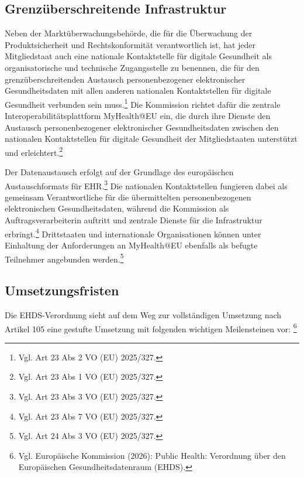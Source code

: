     \subsection{Grenzüberschreitende Infrastruktur}
Neben der Marktüberwachungsbehörde, die für die Überwachung der Produktsicherheit und Rechtskonformität verantwortlich ist, hat jeder Mitgliedstaat auch eine nationale Kontaktstelle für digitale Gesundheit als organisatorische und technische Zugangsstelle zu benennen, die für den grenzüberschreitenden Austausch personenbezogener elektronischer Gesundheitsdaten mit allen anderen nationalen Kontaktstellen für digitale Gesundheit verbunden sein muss.\footnote{Vgl. Art 23 Abs 2 VO (EU) 2025/327.} Die Kommission richtet dafür die zentrale Interoperabilitätsplattform MyHealth@EU ein, die durch ihre Dienste den Austausch personenbezogener elektronischer Gesundheitsdaten zwischen den nationalen Kontaktstellen für digitale Gesundheit der Mitgliedstaaten unterstützt und erleichtert.\footnote{Vgl. Art 23 Abs 1 VO (EU) 2025/327.}

Der Datenaustausch erfolgt auf der Grundlage des europäischen Austauschformats für EHR.\footnote{Vgl. Art 23 Abs 3 VO (EU) 2025/327.}
Die nationalen Kontaktstellen fungieren dabei als gemeinsam Verantwortliche für die übermittelten personenbezogenen elektronischen Gesundheitsdaten, während die Kommission als Auftragsverarbeiterin auftritt und zentrale Dienste für die Infrastruktur erbringt.\footnote{Vgl. Art 23 Abs 7 VO (EU) 2025/327.}
Drittstaaten und internationale Organisationen können unter Einhaltung der Anforderungen an MyHealth@EU ebenfalls als befugte Teilnehmer angebunden werden.\footnote{Vgl. Art 24 Abs 3 VO (EU) 2025/327.}

    \subsection{Umsetzungsfristen}
Die EHDS-Verordnung sieht auf dem Weg zur vollständigen Umsetzung nach Artikel 105 eine gestufte Umsetzung mit folgenden wichtigen Meilensteinen vor: \footnote{Vgl. Europäische Kommission (2026): Public Health: Verordnung über den Europäischen Gesundheitsdatenraum (EHDS).}


